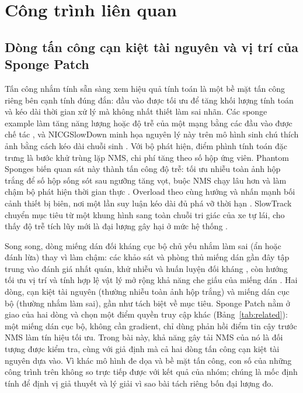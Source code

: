 \documentclass[a4paper,fleqn]{cas-dc}
\begin{document}
\section{Công trình liên quan}
\label{sec:related}
\subsection{Dòng tấn công cạn kiệt tài nguyên và vị trí của Sponge Patch}
Tấn công nhắm tính sẵn sàng xem hiệu quả tính toán là một bề mặt tấn công riêng bên cạnh tính đúng đắn: đầu vào được tối ưu để tăng khối lượng tính toán và kéo dài thời gian xử lý mà không nhất thiết làm sai nhãn. Các sponge example làm tăng năng lượng hoặc độ trễ của một mạng bằng các đầu vào được chế tác \cite{shumailov2021sponge}, và NICGSlowDown minh họa nguyên lý này trên mô hình sinh chú thích ảnh bằng cách kéo dài chuỗi sinh \cite{nicgslowdown2022}. Với bộ phát hiện, điểm phình tính toán đặc trưng là bước khử trùng lặp NMS, chi phí tăng theo số hộp ứng viên. Phantom Sponges biến quan sát này thành tấn công độ trễ: tối ưu nhiễu toàn ảnh hộp trắng để số hộp sống sót sau ngưỡng tăng vọt, buộc NMS chạy lâu hơn và làm chậm bộ phát hiện thời gian thực \cite{phantom2023}. Overload theo cùng hướng và nhấn mạnh bối cảnh thiết bị biên, nơi một lần suy luận kéo dài đủ phá vỡ thời hạn \cite{overload2024}. SlowTrack chuyển mục tiêu từ một khung hình sang toàn chuỗi tri giác của xe tự lái, cho thấy độ trễ tích lũy mới là đại lượng gây hại ở mức hệ thống \cite{slowtrack2024}.

Song song, dòng miếng dán đối kháng cục bộ chủ yếu nhắm làm sai (ẩn hoặc đánh lừa) thay vì làm chậm: các khảo sát và phòng thủ miếng dán gần đây tập trung vào đánh giá nhất quán, khử nhiễu và huấn luyện đối kháng \cite{apde2025,pbcat2025}, còn hướng tối ưu vị trí và tính hợp lệ vật lý mở rộng khả năng che giấu của miếng dán \cite{iap2025,badpatch2025}. Hai dòng, cạn kiệt tài nguyên (thường nhiễu toàn ảnh hộp trắng) và miếng dán cục bộ (thường nhắm làm sai), gần như tách biệt về mục tiêu. Sponge Patch nằm ở giao của hai dòng và chọn một điểm quyền truy cập khác (Bảng~\ref{tab:related}): một miếng dán cục bộ, không cần gradient, chỉ dùng phản hồi điểm tin cậy trước NMS làm tín hiệu tối ưu. Trong bài này, khả năng gây tải NMS của nó là đối tượng được kiểm tra, cùng với giả định mà cả hai dòng tấn công cạn kiệt tài nguyên dựa vào. Vì khác mô hình đe dọa và bề mặt tấn công, con số của những công trình trên không so trực tiếp được với kết quả của nhóm; chúng là mốc định tính để định vị giả thuyết và lý giải vì sao bài tách riêng bốn đại lượng đo.
\end{document}
